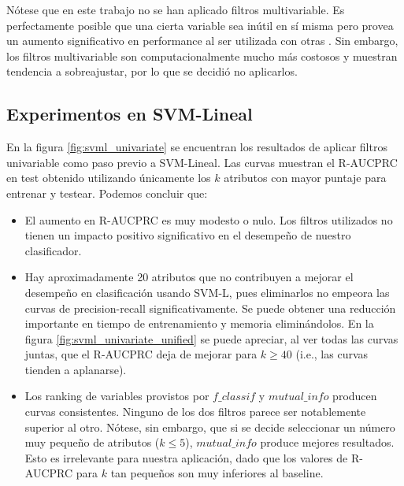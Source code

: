 Nótese que en este trabajo no se han aplicado filtros multivariable. Es perfectamente posible que una cierta variable sea inútil en sí misma pero provea un aumento significativo en performance al ser utilizada con otras \cite{fs3}. Sin embargo, los filtros multivariable son computacionalmente mucho más costosos y muestran tendencia a sobreajustar, por lo que se decidió no aplicarlos. 

\subsection{Experimentos en SVM-Lineal}

En la figura \ref{fig:svml_univariate} se encuentran los resultados de aplicar filtros univariable como paso previo a SVM-Lineal. Las curvas muestran el R-AUCPRC en test obtenido utilizando únicamente los $k$ atributos con mayor puntaje para entrenar y testear. Podemos concluir que:

\begin{itemize}
\item El aumento en R-AUCPRC es muy modesto o nulo. Los filtros utilizados no tienen un impacto positivo significativo en el desempeño de nuestro clasificador.
\item Hay aproximadamente 20 atributos que no contribuyen a mejorar el desempeño en clasificación usando SVM-L, pues eliminarlos no empeora las curvas de precision-recall significativamente. Se puede obtener una reducción importante en tiempo de entrenamiento y memoria eliminándolos. En la figura \ref{fig:svml_univariate_unified} se puede apreciar, al ver todas las curvas juntas, que el R-AUCPRC deja de mejorar para $k\geq40$ (i.e., las curvas tienden a aplanarse).
\item Los ranking de variables provistos por $f\_classif$ y $mutual\_info$ producen curvas consistentes. Ninguno de los dos filtros parece ser notablemente superior al otro. Nótese, sin embargo, que si se decide seleccionar un número muy pequeño de atributos ($k\leq5$), $mutual\_info$ produce mejores resultados. Esto es irrelevante para nuestra aplicación, dado que los valores de R-AUCPRC para $k$ tan pequeños son muy inferiores al baseline.
\end{itemize}

